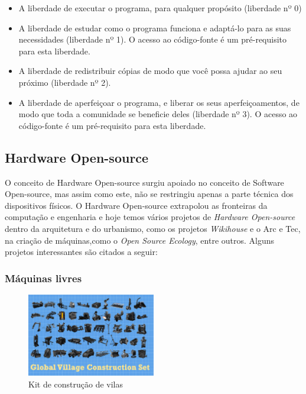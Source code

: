 \documentclass[final,12pt, times, 5p, twocolumn]{elsarticle}
\begin{document}
\begin{itemize}
  \item A liberdade de executar o programa, para qualquer propósito (liberdade nº 0)
  \item A liberdade de estudar como o programa funciona e adaptá-lo para as suas necessidades (liberdade nº 1). O acesso ao código-fonte é um pré-requisito para esta liberdade.
  \item A liberdade de redistribuir cópias de modo que você possa ajudar ao seu próximo (liberdade nº 2).
  \item A liberdade de aperfeiçoar o programa, e liberar os seus aperfeiçoamentos, de modo que toda a comunidade se beneficie deles (liberdade nº 3). O acesso ao código-fonte é um pré-requisito para esta liberdade.
\end{itemize}

\subsection{Hardware Open-source}

O conceito de Hardware Open-source surgiu apoiado no conceito de Software Open-source, mas assim como este, não se restringiu apenas a parte técnica dos dispositivos físicos. O Hardware Open-source extrapolou as fronteiras da computação e engenharia e hoje temos vários projetos de \textit{Hardware Open-source} dentro da arquitetura e do urbanismo, como os projetos \textit{Wikihouse} e o Arc e Tec, na criação de máquinas,como o \textit{Open Source Ecology}, entre outros. Alguns projetos interessantes são citados a seguir:

\subsubsection{Máquinas livres}

\begin{figure}[ht!]
\centering
\includegraphics[width=0.5\textwidth]{gvcs.jpg}
\caption{\label{fig:gvcs}Kit de construção de vilas}
\end{figure}
\end{document}
